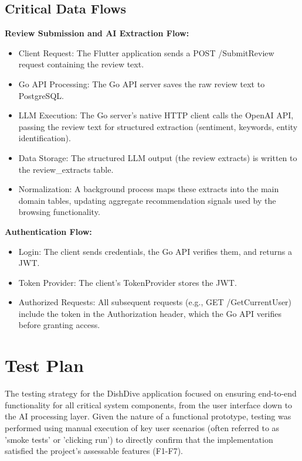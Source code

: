 \subsection{Critical Data Flows}

\textbf{Review Submission and AI Extraction Flow:}

\begin{itemize}
	\item Client Request: The Flutter application sends a POST /SubmitReview request containing the review text.
	\item Go API Processing: The Go API server saves the raw review text to PostgreSQL.
	\item LLM Execution: The Go server's native HTTP client calls the OpenAI API, passing the review text for structured extraction (sentiment, keywords, entity identification).
	\item Data Storage: The structured LLM output (the review extracts) is written to the review\_extracts table.
	\item Normalization: A background process maps these extracts into the main domain tables, updating aggregate recommendation signals used by the browsing functionality.
\end{itemize}

\textbf{Authentication Flow:}

\begin{itemize}
	\item Login: The client sends credentials, the Go API verifies them, and returns a JWT.
	\item Token Provider: The client's TokenProvider stores the JWT.
	\item Authorized Requests: All subsequent requests (e.g., GET /GetCurrentUser) include the token in the Authorization header, which the Go API verifies before granting access.
\end{itemize}

\section{Test Plan}

The testing strategy for the DishDive application focused on ensuring end-to-end functionality for all critical system components, from the user interface down to the AI processing layer. Given the nature of a functional prototype, testing was performed using manual execution of key user scenarios (often referred to as 'smoke tests' or 'clicking run') to directly confirm that the implementation satisfied the project's assessable features (F1-F7).

